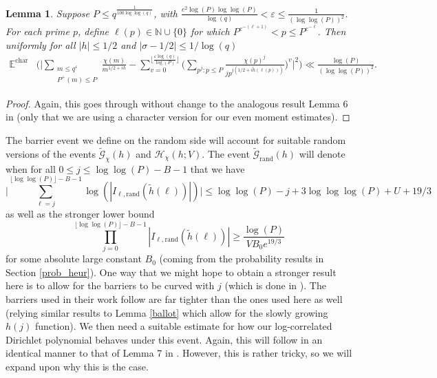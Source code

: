 \documentclass[reqno]{amsart}
\newtheorem{lemma}{Lemma}
\theoremstyle{definition}
\theoremstyle{remark}
\numberwithin{equation}{section}
\theoremstyle{remark}
\begin{document}
\begin{lemma}
    Suppose $P \leq q^{\frac{1}{100\log\log(q)}}$, with $\frac{e^2\log(P)\log\log(P)}{\log(q)}<\varepsilon \leq \frac{1}{(\log\log(P))^2}$. For each prime $p$, define $\ell(p) \in \mathbb{N} \cup \{0\}$ for which $P^{e^{-(\ell+1)}} < p \leq P^{e^{-\ell}}$. Then uniformly for all $|h| \leq 1/2$ and $|\sigma-1/2| \leq 1/\log(q)$
    \begin{align*}
        \mathbb{E}^{\text{char}}&\bigg(\big|\sum_{\substack{m \leq q^{\varepsilon} \\ P^+(m) \leq P}}\frac{\chi(m)}{m^{1/2+ih}}-\sum_{v=0}^{\lfloor\frac{\varepsilon\log(q)}{\log(P)}\rfloor}\big(\sum_{p^j:p \leq P}\frac{\chi(p)^j}{jp^{j(1/2+i\tilde{h}(\ell(p)))}}\big)^v\big|^2\bigg) \ll \frac{\log(P)}{(\log\log(P))^2}.
    \end{align*} \label{partial_exp}
\end{lemma}
\begin{proof}
    Again, this goes through without change to the analogous result Lemma 6 in \cite{harper2019partition} (only that we are using a character version for our even moment estimates).
\end{proof}
The barrier event we define on the random side will account for suitable random versions of the events $\widetilde{\mathcal{G}}_{\chi}(h)$ and $\mathcal{H}_\chi(h;V)$. The event $\widetilde{\mathcal{G}}_{\text{rand}}(h)$ will denote when for all $0 \leq j \leq \log\log(P)-B-1$ that we have
$$ \big|\sum_{\ell = j}^{\lfloor\log\log(P)\rfloor-B-1}\log(|I_{\ell,\text{rand}}(\tilde{h}(\ell))|)\big| \leq \log\log(P) -j + 3\log\log\log(P)+U+19/3$$
as well as the stronger lower bound
$$\prod_{j=0}^{\lfloor\log\log(P)\rfloor-B-1}|I_{\ell,\text{rand}}(\tilde{h}(\ell))| \geq \frac{\log(P)}{VB_0e^{19/3}}$$
for some absolute large constant $B_0$ (coming from the probability results in Section \ref{prob_heur}). One way that we might hope to obtain a stronger result here is to allow for the barriers to be curved with $j$ (which is done in \cite{abr20}). The barriers used in their work follow are far tighter than the ones used here as well (relying similar results to Lemma \ref{ballot} which allow for the slowly growing $h(j)$ function). We then need a suitable estimate for how our log-correlated Dirichlet polynomial behaves under this event. Again, this will follow in an identical manner to that of Lemma 7 in \cite{harper2019partition}. However, this is rather tricky, so we will expand upon why this is the case.
\end{document}
